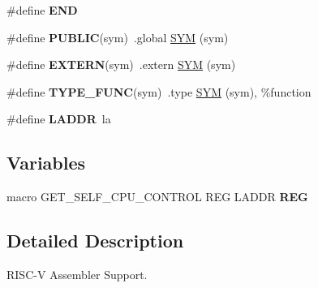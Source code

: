\begin{DoxyCompactItemize}
\mbox{\label{group__RTEMSScoreCPURISCVASM_ga29fd18bed01c4d836c7ebfe73a125c3f}} 
\#define {\bfseries E\+ND}
\item 
\mbox{\label{group__RTEMSScoreCPURISCVASM_ga5e536c0e80cb78da6a74541281111e40}} 
\#define {\bfseries P\+U\+B\+L\+IC}(sym)~.global \mbox{\hyperlink{group__RTEMSScoreCPUx86-64ASM_gafe05d428a5f345f51fb591debb815325}{S\+YM}} (sym)
\item 
\mbox{\label{group__RTEMSScoreCPURISCVASM_ga9808b867f8d1bd54d78548a5cd5dc415}} 
\#define {\bfseries E\+X\+T\+E\+RN}(sym)~.extern \mbox{\hyperlink{group__RTEMSScoreCPUx86-64ASM_gafe05d428a5f345f51fb591debb815325}{S\+YM}} (sym)
\item 
\mbox{\label{group__RTEMSScoreCPURISCVASM_ga87dc18b178219c10907e914f15202b0e}} 
\#define {\bfseries T\+Y\+P\+E\+\_\+\+F\+U\+NC}(sym)~.type \mbox{\hyperlink{group__RTEMSScoreCPUx86-64ASM_gafe05d428a5f345f51fb591debb815325}{S\+YM}} (sym), \%function
\item 
\mbox{\label{group__RTEMSScoreCPURISCVASM_gad718a2eb02b3f8c2fe2ec23cb9695e4e}} 
\#define {\bfseries L\+A\+D\+DR}~la
\end{DoxyCompactItemize}
\subsection*{Variables}
\begin{DoxyCompactItemize}
\item 
\mbox{\label{group__RTEMSScoreCPURISCVASM_ga0b0d4e6d878cb3967e6e0953bfb61dc9}} 
macro G\+E\+T\+\_\+\+S\+E\+L\+F\+\_\+\+C\+P\+U\+\_\+\+C\+O\+N\+T\+R\+OL R\+EG L\+A\+D\+DR {\bfseries R\+EG}
\end{DoxyCompactItemize}


\subsection{Detailed Description}
R\+I\+S\+C-\/V Assembler Support. 

